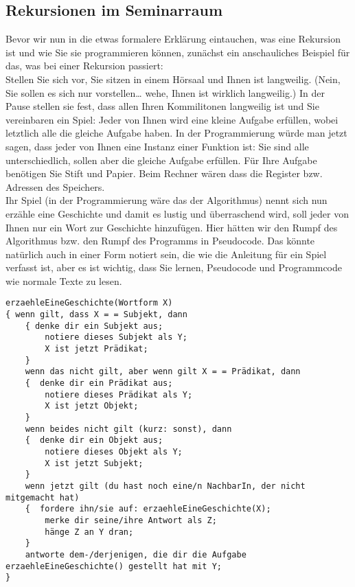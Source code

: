 \subsection{Rekursionen im Seminarraum}

Bevor wir nun in die etwas formalere Erklärung eintauchen, was eine Rekursion ist und wie Sie sie programmieren können, zunächst ein anschauliches Beispiel für das, was bei einer Rekursion passiert:\\

Stellen Sie sich vor, Sie sitzen in einem Hörsaal und Ihnen ist langweilig. (Nein, Sie sollen es sich nur vorstellen… wehe, Ihnen ist wirklich langweilig.) In der Pause stellen sie fest, dass allen Ihren Kommilitonen langweilig ist und Sie vereinbaren ein Spiel: Jeder von Ihnen wird eine kleine Aufgabe erfüllen, wobei letztlich alle die gleiche Aufgabe haben. In der Programmierung würde man jetzt sagen, dass jeder von Ihnen eine Instanz einer Funktion ist: Sie sind alle unterschiedlich, sollen aber die gleiche Aufgabe erfüllen. Für Ihre Aufgabe benötigen Sie Stift und Papier. Beim Rechner wären dass die Register bzw. Adressen des Speichers.\\

Ihr Spiel (in der Programmierung wäre das der Algorithmus) nennt sich nun erzähle eine Geschichte und damit es lustig und überraschend wird, soll jeder von Ihnen nur ein Wort zur Geschichte hinzufügen. Hier hätten wir den Rumpf des Algorithmus bzw. den Rumpf des Programms in Pseudocode. Das könnte natürlich auch in einer Form notiert sein, die wie die Anleitung für ein Spiel verfasst ist, aber es ist wichtig, dass Sie lernen, Pseudocode und Programmcode wie normale Texte zu lesen.\\

\begin{verbatim}
erzaehleEineGeschichte(Wortform X)
{ wenn gilt, dass X = = Subjekt, dann
	{ denke dir ein Subjekt aus;
		notiere dieses Subjekt als Y;
		X ist jetzt Prädikat;
	}
	wenn das nicht gilt, aber wenn gilt X = = Prädikat, dann
	{  denke dir ein Prädikat aus;
		notiere dieses Prädikat als Y;
		X ist jetzt Objekt;
	}
	wenn beides nicht gilt (kurz: sonst), dann
	{  denke dir ein Objekt aus;
		notiere dieses Objekt als Y;
		X ist jetzt Subjekt;
	}
	wenn jetzt gilt (du hast noch eine/n NachbarIn, der nicht mitgemacht hat)
	{  fordere ihn/sie auf: erzaehleEineGeschichte(X);
		merke dir seine/ihre Antwort als Z;
		hänge Z an Y dran; 
	}
	antworte dem-/derjenigen, die dir die Aufgabe erzaehleEineGeschichte() gestellt hat mit Y;
}
\end{verbatim}


